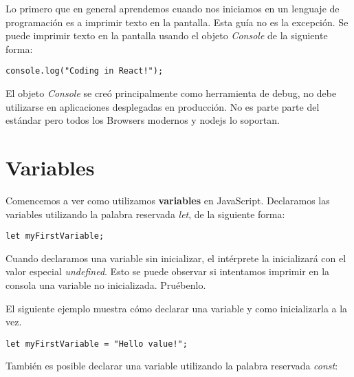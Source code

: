 \documentclass[a4paper, oneside, titlepage, 12pt]{paper}
\begin{document}
Lo primero que en general aprendemos cuando nos iniciamos en un lenguaje de programación es a imprimir texto en la pantalla. Esta guía no es la excepción. Se puede imprimir texto en la pantalla usando el objeto \textit{Console} de la siguiente forma:

\begin{verbatim}
console.log("Coding in React!");
\end{verbatim}

El objeto \textit{Console} se creó principalmente como herramienta de debug, no debe utilizarse en aplicaciones desplegadas en producción. No es parte parte del estándar pero todos los Browsers modernos y \textsf{nodejs} lo soportan.
\newline

\section{Variables}

Comencemos a ver como utilizamos \textbf{variables} en JavaScript. Declaramos las variables utilizando la palabra reservada \textit{let}, de la siguiente forma:

\begin{verbatim}
let myFirstVariable;
\end{verbatim}

Cuando declaramos una variable sin inicializar, el intérprete la inicializará con el valor especial \textit{undefined}. Esto se puede observar si intentamos imprimir en la consola una variable no inicializada. Pruébenlo. 


El siguiente ejemplo muestra cómo declarar una variable y como inicializarla a la vez.

\begin{verbatim}
let myFirstVariable = "Hello value!";
\end{verbatim}

También es posible declarar una variable utilizando la palabra reservada \textit{const}:
\end{document}
